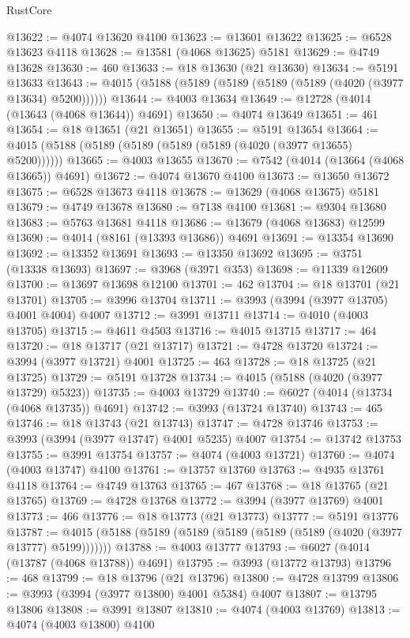 \begin{lexlean}{RustCore}
\begin{coremodule}
@13622 := @4074 @13620 @4100
@13623 := @13601 @13622
@13625 := @6528 @13623 @4118
@13628 := @13581 (@4068 @13625) @5181
@13629 := @4749 @13628
@13630 := 460
@13633 := @18 @13630 (@21 @13630)
@13634 := @5191 @13633
@13643 := @4015 (@5188 (@5189 (@5189 (@5189 (@5189 (@4020 (@3977 @13634) @5200))))))
@13644 := @4003 @13634
@13649 := @12728 (@4014 (@13643 (@4068 @13644)) @4691)
@13650 := @4074 @13649
@13651 := 461
@13654 := @18 @13651 (@21 @13651)
@13655 := @5191 @13654
@13664 := @4015 (@5188 (@5189 (@5189 (@5189 (@5189 (@4020 (@3977 @13655) @5200))))))
@13665 := @4003 @13655
@13670 := @7542 (@4014 (@13664 (@4068 @13665)) @4691)
@13672 := @4074 @13670 @4100
@13673 := @13650 @13672
@13675 := @6528 @13673 @4118
@13678 := @13629 (@4068 @13675) @5181
@13679 := @4749 @13678
@13680 := @7138 @4100
@13681 := @9304 @13680
@13683 := @5763 @13681 @4118
@13686 := @13679 (@4068 @13683) @12599
@13690 := @4014 (@8161 (@13393 @13686)) @4691
@13691 := @13354 @13690
@13692 := @13352 @13691
@13693 := @13350 @13692
@13695 := @3751 (@13338 @13693)
@13697 := @3968 (@3971 @353)
@13698 := @11339 @12609
@13700 := @13697 @13698 @12100
@13701 := 462
@13704 := @18 @13701 (@21 @13701)
@13705 := @3996 @13704
@13711 := @3993 (@3994 (@3977 @13705) @4001 @4004) @4007
@13712 := @3991 @13711
@13714 := @4010 (@4003 @13705)
@13715 := @4611 @4503
@13716 := @4015 @13715
@13717 := 464
@13720 := @18 @13717 (@21 @13717)
@13721 := @4728 @13720
@13724 := @3994 (@3977 @13721) @4001
@13725 := 463
@13728 := @18 @13725 (@21 @13725)
@13729 := @5191 @13728
@13734 := @4015 (@5188 (@4020 (@3977 @13729) @5323))
@13735 := @4003 @13729
@13740 := @6027 (@4014 (@13734 (@4068 @13735)) @4691)
@13742 := @3993 (@13724 @13740)
@13743 := 465
@13746 := @18 @13743 (@21 @13743)
@13747 := @4728 @13746
@13753 := @3993 (@3994 (@3977 @13747) @4001 @5235) @4007
@13754 := @13742 @13753
@13755 := @3991 @13754
@13757 := @4074 (@4003 @13721)
@13760 := @4074 (@4003 @13747) @4100
@13761 := @13757 @13760
@13763 := @4935 @13761 @4118
@13764 := @4749 @13763
@13765 := 467
@13768 := @18 @13765 (@21 @13765)
@13769 := @4728 @13768
@13772 := @3994 (@3977 @13769) @4001
@13773 := 466
@13776 := @18 @13773 (@21 @13773)
@13777 := @5191 @13776
@13787 := @4015 (@5188 (@5189 (@5189 (@5189 (@5189 (@5189 (@4020 (@3977 @13777) @5199)))))))
@13788 := @4003 @13777
@13793 := @6027 (@4014 (@13787 (@4068 @13788)) @4691)
@13795 := @3993 (@13772 @13793)
@13796 := 468
@13799 := @18 @13796 (@21 @13796)
@13800 := @4728 @13799
@13806 := @3993 (@3994 (@3977 @13800) @4001 @5384) @4007
@13807 := @13795 @13806
@13808 := @3991 @13807
@13810 := @4074 (@4003 @13769)
@13813 := @4074 (@4003 @13800) @4100

\end{coremodule}
\end{lexlean}
